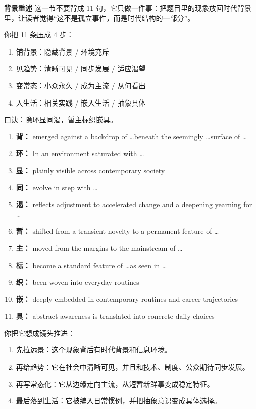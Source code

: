 ﻿\documentclass[lang=cn,11pt]{elegantbook}
\begin{document}
\begin{note}
\textbf{背景重述} 这一节不要背成 11 句，它只做一件事：把题目里的现象放回时代背景里，让读者觉得“这不是孤立事件，而是时代结构的一部分”。

你把 11 条压成 4 步：

\begin{enumerate}
  \item 铺背景：隐藏背景 / 环境充斥
  \item 见趋势：清晰可见 / 同步发展 / 适应渴望
  \item 变常态：小众永久 / 成为主流 / 从何看出
  \item 入生活：相关实践 / 嵌入生活 / 抽象具体
\end{enumerate}

口诀：隐环显同渴，暂主标织嵌具。

\begin{enumerate}
  \item \textbf{背：} emerged against a backdrop of \ldots beneath the seemingly \ldots surface of \ldots
  \item \textbf{环：} In an environment saturated with \ldots
  \item \textbf{显：} plainly visible across contemporary society
  \item \textbf{同：} evolve in step with \ldots
  \item \textbf{渴：} reflects adjustment to accelerated change and a deepening yearning for \ldots
  \item \textbf{暂：} shifted from a transient novelty to a permanent feature of \ldots
  \item \textbf{主：} moved from the margins to the mainstream of \ldots
  \item \textbf{标：} become a standard feature of \ldots as seen in \ldots
  \item \textbf{织：} been woven into everyday routines
  \item \textbf{嵌：} deeply embedded in contemporary routines and career trajectories
  \item \textbf{具：} abstract awareness is translated into concrete daily choices
\end{enumerate}

你把它想成镜头推进：

\begin{enumerate}
  \item 先拉远景：这个现象背后有时代背景和信息环境。
  \item 再给趋势：它在社会中清晰可见，并且和技术、制度、公众期待同步发展。
  \item 再写常态化：它从边缘走向主流，从短暂新鲜事变成稳定特征。
  \item 最后落到生活：它被编入日常惯例，并把抽象意识变成具体选择。
\end{enumerate}


\end{note}
\end{document}
